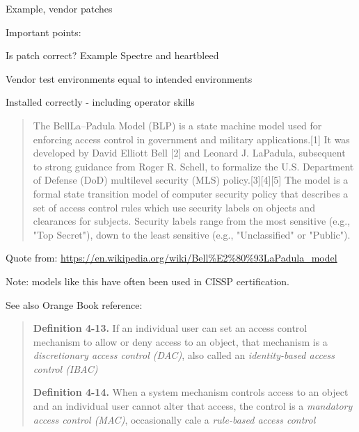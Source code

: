 \documentclass[Screen16to9,17pt]{foils}
\begin{document}
\begin{list1}
\item Example, vendor patches
\item Important points:
\begin{list2}
\item Is patch correct? Example Spectre and heartbleed
\item Vendor test environments equal to intended environments
\item Installed correctly - including operator skills
\end{list2}
\end{list1}




\begin{quote}
The BellLa--Padula Model (BLP) is a state machine model used for enforcing access control in government and military applications.[1] It was developed by David Elliott Bell [2] and Leonard J. LaPadula, subsequent to strong guidance from Roger R. Schell, to formalize the U.S. Department of Defense (DoD) multilevel security (MLS) policy.[3][4][5] The model is a formal state transition model of computer security policy that describes a set of access control rules which use security labels on objects and clearances for subjects. Security labels range from the most sensitive (e.g., "Top Secret"), down to the least sensitive (e.g., "Unclassified" or "Public").
\end{quote}

Quote from:
\url{https://en.wikipedia.org/wiki/Bell%E2%80%93LaPadula_model}

Note: models like this have often been used in CISSP certification.

See also Orange Book reference:\\ 



\begin{quote}
{\bf Definition 4-13.} If an individual user can set an access control mechanism to allow or deny access to an object, that mechanism is a \emph{discretionary access control (DAC)}, also called an \emph{identity-based access control (IBAC)}

{\bf Definition 4-14.}  When a system mechanism controls access to an object and an individual user cannot alter that access, the control is a \emph{mandatory access control (MAC)}, occasionally cale a \emph{rule-based access control}
\end{quote}
\end{document}
